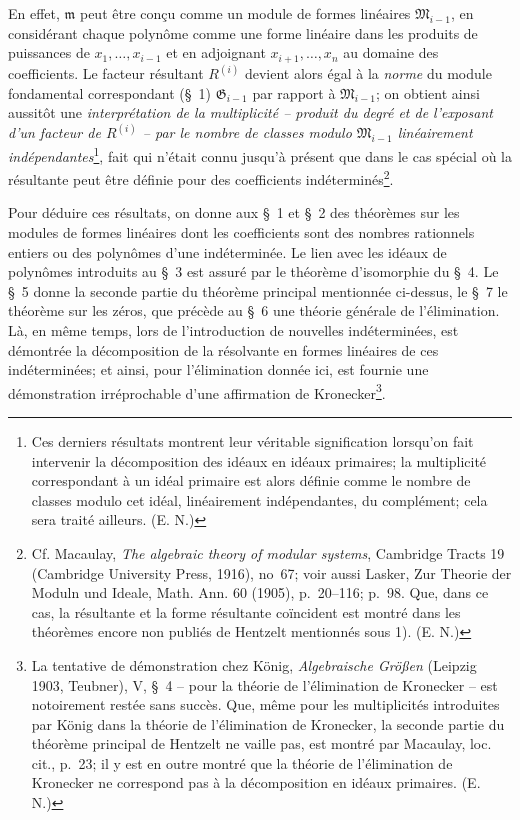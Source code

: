 \documentclass[11pt]{article}
\providecommand{\Gmod}{\mathfrak G}
\providecommand{\mideal}{\mathfrak m}
\begin{document}
En effet, $\mideal$ peut être conçu comme un module de formes linéaires $\mathfrak M_{i-1}$, en considérant chaque polynôme comme une forme linéaire dans les produits de puissances de $x_1,\ldots,x_{i-1}$ et en adjoignant $x_{i+1},\ldots,x_n$ au domaine des coefficients. Le facteur résultant $R^{(i)}$ devient alors égal à la \emph{norme} du module fondamental correspondant (\S{}~1) $\Gmod_{i-1}$ par rapport à $\mathfrak M_{i-1}$; on obtient ainsi aussitôt une \emph{interprétation de la multiplicité -- produit du degré et de l'exposant d'un facteur de $R^{(i)}$ -- par le nombre de classes modulo $\mathfrak M_{i-1}$ linéairement indépendantes}\footnote{Ces derniers résultats montrent leur véritable signification lorsqu'on fait intervenir la décomposition des idéaux en idéaux primaires; la multiplicité correspondant à un idéal primaire est alors définie comme le nombre de classes modulo cet idéal, linéairement indépendantes, du complément; cela sera traité ailleurs. (E. N.)}, fait qui n'était connu jusqu'à présent que dans le cas spécial où la résultante peut être définie pour des coefficients indéterminés\footnote{Cf. Macaulay, \emph{The algebraic theory of modular systems}, Cambridge Tracts 19 (Cambridge University Press, 1916), no~67; voir aussi Lasker, Zur Theorie der Moduln und Ideale, Math. Ann. 60 (1905), p.~20--116; p.~98. Que, dans ce cas, la résultante et la forme résultante coïncident est montré dans les théorèmes encore non publiés de Hentzelt mentionnés sous 1). (E. N.)}.

Pour déduire ces résultats, on donne aux \S{}~1 et \S{}~2 des théorèmes sur les modules de formes linéaires dont les coefficients sont des nombres rationnels entiers ou des polynômes d'une indéterminée. Le lien avec les idéaux de polynômes introduits au \S{}~3 est assuré par le théorème d'isomorphie du \S{}~4. Le \S{}~5 donne la seconde partie du théorème principal mentionnée ci-dessus, le \S{}~7 le théorème sur les zéros, que précède au \S{}~6 une théorie générale de l'élimination. Là, en même temps, lors de l'introduction de nouvelles indéterminées, est démontrée la décomposition de la résolvante en formes linéaires de ces indéterminées; et ainsi, pour l'élimination donnée ici, est fournie une démonstration irréprochable d'une affirmation de Kronecker\footnote{La tentative de démonstration chez König, \emph{Algebraische Größen} (Leipzig 1903, Teubner), V, \S{}~4 -- pour la théorie de l'élimination de Kronecker -- est notoirement restée sans succès. Que, même pour les multiplicités introduites par König dans la théorie de l'élimination de Kronecker, la seconde partie du théorème principal de Hentzelt ne vaille pas, est montré par Macaulay, loc. cit., p.~23; il y est en outre montré que la théorie de l'élimination de Kronecker ne correspond pas à la décomposition en idéaux primaires. (E. N.)}.
\end{document}
